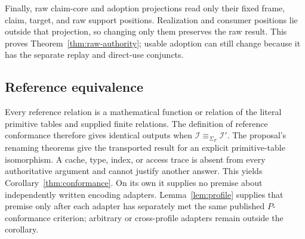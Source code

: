 \documentclass[11pt,twoside]{article}
\begin{document}
Finally, raw claim-core and adoption projections read only their fixed frame,
claim, target, and raw support positions.  Realization and consumer positions lie
outside that projection, so changing only them preserves the raw result.  This
proves Theorem~\ref{thm:raw-authority}; usable adoption can still change because it
has the separate replay and direct-use conjuncts.

\subsection{Reference equivalence}

Every reference relation is a mathematical function or relation of the literal
primitive tables and supplied finite relations.  The definition of reference conformance
therefore gives identical outputs when
\(\mathcal I\equiv_{\Sigma_F}\mathcal I'\).  The proposal's
renaming theorems give the transported result for an explicit primitive-table
isomorphism.  A cache, type, index, or access trace is absent from every
authoritative argument and cannot justify another answer.  This yields
Corollary~\ref{thm:conformance}.  On its own it supplies no premise about
independently written encoding adapters.  Lemma~\ref{lem:profile} supplies that
premise only after each adapter has separately met the same published
\(P\)-conformance criterion; arbitrary or cross-profile adapters remain outside
the corollary.
\end{document}
